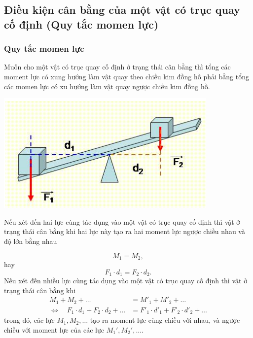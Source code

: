 \subsection{Điều kiện cân bằng của một vật có trục quay cố định (Quy tắc momen lực)}
\vspace{-0.5cm}
\subsubsection{Quy tắc momen lực}

Muốn cho một vật có trục quay cố định ở trạng thái cân bằng thì tổng các moment lực có xung hướng làm vật quay theo chiều kim đồng hồ phải bằng tổng các momen lực có xu hướng làm vật quay ngược chiều kim đồng hồ.

\begin{center}
	\includegraphics[scale=0.5]{../figs/VN10-PH-21-L-016-2-V2-01.png}
\end{center}

Nếu xét đến hai lực cùng tác dụng vào một vật có trục quay cố định thì vật ở trạng thái cân bằng khi hai lực này tạo ra hai moment lực ngược chiều nhau và độ lớn bằng nhau

\begin{equation*}
	M_1 = M_2,
\end{equation*}
%
hay
%
\begin{equation*}
	F_1\cdot d_1 = F_2\cdot d_2. \label{eq2}
\end{equation*}
%
Nếu xét đến nhiều lực cùng tác dụng vào một vật có trục quay cố định thì vật ở trạng thái cân bằng khi 
%
\begin{align*}
	M_1+M_2+\ldots&= M'_1+M'_2+\ldots\\ 
	\Leftrightarrow\quad F_1\cdot d_1+F_2\cdot d_2 + \ldots &= F'_1\cdot d'_1 + F'_2\cdot d'_2+\ldots
\end{align*}
%
trong đó, các lực $M_1,M_2,\ldots$ tạo ra moment lực cùng chiều với nhau, và ngược chiều với moment lực của các lực $M_1',M_2',\ldots$.
\vspace{0.5cm}
